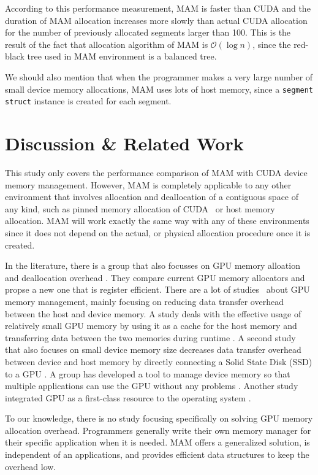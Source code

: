 \documentclass[conference]{IEEEtran}
\def\code#1{\texttt{#1}}
\begin{document}
According to this performance measurement, MAM is faster than CUDA and the duration of MAM allocation increases more slowly than actual CUDA allocation for the number of previously allocated segments larger than 100. This is the result of the fact that allocation algorithm of MAM is $\mathcal{O}(\log n)$, since the red-black tree used in MAM environment is a balanced tree. 

We should also mention that when the programmer makes a very large number of small device memory allocations, MAM uses lots of host memory, since a \code{segment struct} instance is created for each segment.



\section{Discussion \& Related Work}
This study only covers the performance comparison of MAM with CUDA device memory management. However, MAM is completely applicable to any other environment that involves allocation and deallocation of a contiguous space of any kind, such as pinned memory allocation of CUDA~\cite{ICPP-Burak} or host memory allocation. MAM will work exactly the same way with any of these environments since it does not depend on the actual, or physical allocation procedure once it is created.

In the literature, there is a group that also focusses on GPU memory alloation and deallocation overhead \cite{regeff}. They compare current GPU memory allocators and propse a new one that is register efficient. There are a lot of studies~\cite{ICPP-Burak, dCUDA, CuMAS} about GPU memory management, mainly  focusing 
on reducing data transfer overhead between the host and device memory. A study deals with the effective usage of relatively small GPU memory by using it as a cache for the host memory and transferring data between the two memories during runtime \cite{gpudmm}. A second study that also focuses on small device memory size decreases data transfer overhead between device and host memory by directly connecting  a Solid State Disk (SSD) to a GPU \cite{gpussd}. A group has developed a tool to manage device memory so that multiple applications can use the GPU without any problems \cite{gdm}. Another study integrated GPU as a first-class resource to the operating system \cite{gdev}. 

To our knowledge, there is no study focusing specifically on solving GPU memory allocation overhead. Programmers generally write their own memory manager for their specific application when it is needed. MAM offers a generalized solution, is independent of an applications, and provides efficient data structures to keep the overhead low. 
\end{document}
